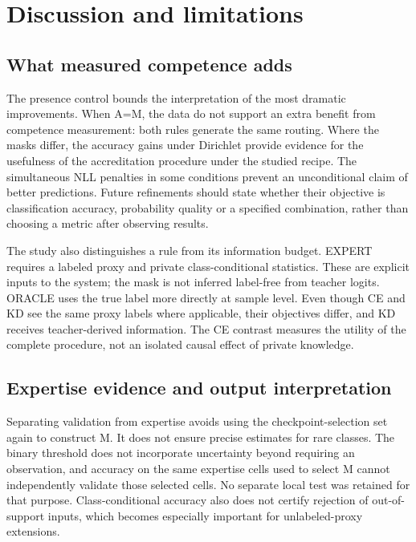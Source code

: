 \hypertarget{discussion-and-limitations}{%
\section{Discussion and limitations}\label{discussion-and-limitations}}

\hypertarget{what-measured-competence-adds}{%
\subsection{What measured competence adds}\label{what-measured-competence-adds}}

The presence control bounds the interpretation of the most dramatic improvements. When A=M, the data do not support an extra benefit from competence measurement: both rules generate the same routing. Where the masks differ, the accuracy gains under Dirichlet provide evidence for the usefulness of the accreditation procedure under the studied recipe. The simultaneous NLL penalties in some conditions prevent an unconditional claim of better predictions. Future refinements should state whether their objective is classification accuracy, probability quality or a specified combination, rather than choosing a metric after observing results.

The study also distinguishes a rule from its information budget. EXPERT requires a labeled proxy and private class-conditional statistics. These are explicit inputs to the system; the mask is not inferred label-free from teacher logits. ORACLE uses the true label more directly at sample level. Even though CE and KD see the same proxy labels where applicable, their objectives differ, and KD receives teacher-derived information. The CE contrast measures the utility of the complete procedure, not an isolated causal effect of private knowledge.

\hypertarget{expertise-evidence-and-output-interpretation}{%
\subsection{Expertise evidence and output interpretation}\label{expertise-evidence-and-output-interpretation}}

Separating validation from expertise avoids using the checkpoint-selection set again to construct M. It does not ensure precise estimates for rare classes. The binary threshold does not incorporate uncertainty beyond requiring an observation, and accuracy on the same expertise cells used to select M cannot independently validate those selected cells. No separate local test was retained for that purpose. Class-conditional accuracy also does not certify rejection of out-of-support inputs, which becomes especially important for unlabeled-proxy extensions.

